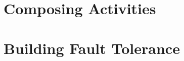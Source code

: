 \documentclass[11pt]{article}
\begin{document}
\section{Composing Activities}



\section{Building Fault Tolerance}

















\end{document}
